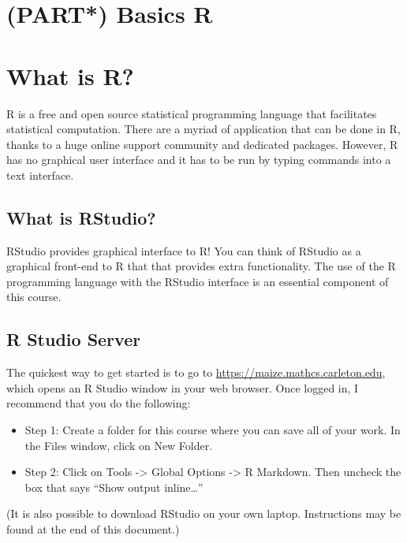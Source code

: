 \documentclass[
]{book}
\providecommand{\tightlist}{%
  \setlength{\itemsep}{0pt}\setlength{\parskip}{0pt}}
\begin{document}
\hypertarget{part-basics-r}{%
\chapter{(PART*) Basics R}\label{part-basics-r}}

\hypertarget{what-is-r}{%
\chapter{What is R?}\label{what-is-r}}

R is a free and open source statistical programming language that facilitates statistical computation. There are a myriad of application that can be done in R, thanks to a huge online support community and dedicated packages. However, R has no graphical user interface and it has to be run by typing commands into a text interface.

\hypertarget{what-is-rstudio}{%
\section{What is RStudio?}\label{what-is-rstudio}}

RStudio provides graphical interface to R! You can think of RStudio as a graphical front-end to R that that provides extra functionality. The use of the R programming language with the RStudio interface is an essential component of this course.

\hypertarget{r-studio-server}{%
\section{R Studio Server}\label{r-studio-server}}

The quickest way to get started is to go to \url{https://maize.mathcs.carleton.edu}, which opens an R Studio window in your web browser. Once logged in, I recommend that you do the following:

\begin{itemize}
\tightlist
\item
  Step 1: Create a folder for this course where you can save all of your work. In the Files window, click on New Folder.
\item
  Step 2: Click on Tools -\textgreater{} Global Options -\textgreater{} R Markdown. Then uncheck the box that says ``Show output inline\ldots{}''
\end{itemize}

(It is also possible to download RStudio on your own laptop. Instructions may be found at the end of this document.)
\end{document}
